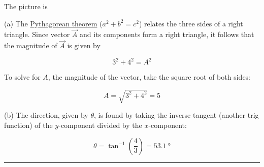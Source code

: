 \documentclass[main-physics.tex]{subfiles}
\begin{document}
\Solution The picture is

\begin{figure}[h!]
    \centering
{}
\end{figure}

(a) The \href{https://mathworld.wolfram.com/PythagoreanTheorem.html}{Pythagorean theorem} ($a^2 + b^2 = c^2$) relates the three sides of a right triangle. Since vector $\vec{A}$ and its components form a right triangle, it follows that the magnitude of $\vec{A}$ is given by

\begin{equation*}
    3^2 + 4^2 = A^2
\end{equation*}

To solve for $A$, the magnitude of the vector, take the square root of both sides:

\begin{equation*}
    A = \sqrt{3^2 + 4^2} = 5
\end{equation*}

(b) The direction, given by $\theta$, is found by taking the inverse tangent (another trig function) of the $y$-component divided by the $x$-component:

\begin{equation*}
    \theta = \tan^{-1}\left(\frac{4}{3}\right) = \SI{53.1}{\degree}
\end{equation*}

\hrule

\clearpage
\end{document}
